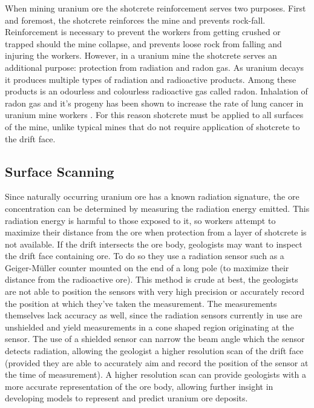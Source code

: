 When mining uranium ore the shotcrete reinforcement serves two purposes. First and foremost, the shotcrete reinforces the mine and prevents rock-fall. Reinforcement is necessary to prevent the workers from getting crushed or trapped should the mine collapse, and prevents loose rock from falling and injuring the workers. However, in a uranium mine the shotcrete serves an additional purpose: protection from radiation and radon gas. As uranium decays it produces multiple types of radiation and radioactive products. Among these products is an odourless and colourless radioactive gas called radon. Inhalation of radon gas and it's progeny has been shown to increase the rate of lung cancer in uranium mine workers \cite{radon}. For this reason shotcrete must be applied to all surfaces of the mine, unlike typical mines that do not require application of shotcrete to the drift face.\\

\subsection{Surface Scanning}

Since naturally occurring uranium ore has a known radiation signature, the ore concentration can be determined by measuring the radiation energy emitted. This radiation energy is harmful to those exposed to it, so workers attempt to maximize their distance from the ore when protection from a layer of shotcrete is not available. If the drift intersects the ore body, geologists may want to inspect the drift face containing ore. To do so they use a radiation sensor such as a Geiger-M{\"u}ller counter mounted on the end of a long pole (to maximize their distance from the radioactive ore). This method is crude at best, the geologists are not able to position the sensors with very high precision or accurately record the position at which they've taken the measurement. The measurements themselves lack accuracy as well, since the radiation sensors currently in use are unshielded and yield measurements in a cone shaped region originating at the sensor. The use of a shielded sensor can narrow the beam angle which the sensor detects radiation, allowing the geologist a higher resolution scan of the drift face (provided they are able to accurately aim and record the position of the sensor at the time of measurement). A higher resolution scan can provide geologists with a more accurate representation of the ore body, allowing further insight in developing models to represent and predict uranium ore deposits.\\


